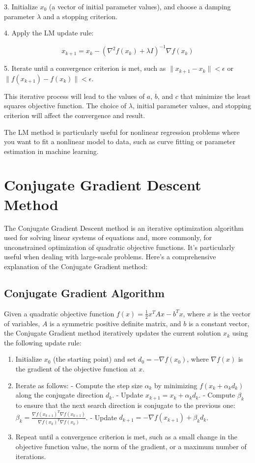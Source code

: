 \documentclass[a4paper]{article}
\begin{document}
3. Initialize $x_0$ (a vector of initial parameter values), and choose a damping parameter $\lambda$ and a stopping criterion.

4. Apply the LM update rule:

\[
x_{k+1} = x_k - \left(\nabla^2 f(x_k) + \lambda I\right)^{-1} \nabla f(x_k)
\]

5. Iterate until a convergence criterion is met, such as $\|x_{k+1} - x_k\| < \epsilon$ or $\|f(x_{k+1}) - f(x_k)\| < \epsilon$.

This iterative process will lead to the values of $a$, $b$, and $c$ that minimize the least squares objective function. The choice of $\lambda$, initial parameter values, and stopping criterion will affect the convergence and result.

The LM method is particularly useful for nonlinear regression problems where you want to fit a nonlinear model to data, such as curve fitting or parameter estimation in machine learning.

\section{Conjugate Gradient Descent Method}

The Conjugate Gradient Descent method is an iterative optimization algorithm used for solving linear systems of equations and, more commonly, for unconstrained optimization of quadratic objective functions. It's particularly useful when dealing with large-scale problems. Here's a comprehensive explanation of the Conjugate Gradient method:

\subsection{Conjugate Gradient Algorithm}

Given a quadratic objective function $f(x) = \frac{1}{2}x^TAx - b^Tx$, where $x$ is the vector of variables, $A$ is a symmetric positive definite matrix, and $b$ is a constant vector, the Conjugate Gradient method iteratively updates the current solution $x_k$ using the following update rule:

\begin{enumerate}
  \item Initialize $x_0$ (the starting point) and set $d_0 = -\nabla f(x_0)$, where $\nabla f(x)$ is the gradient of the objective function at $x$.

  \item Iterate as follows:
     - Compute the step size $\alpha_k$ by minimizing $f(x_k + \alpha_k d_k)$ along the conjugate direction $d_k$.
     - Update $x_{k+1} = x_k + \alpha_k d_k$.
     - Compute $\beta_k$ to ensure that the next search direction is conjugate to the previous one: $\beta_k = \frac{{\nabla f(x_{k+1})^T \nabla f(x_{k+1})}}{{\nabla f(x_k)^T \nabla f(x_k)}}$.
     - Update $d_{k+1} = -\nabla f(x_{k+1}) + \beta_k d_k$.

  \item Repeat until a convergence criterion is met, such as a small change in the objective function value, the norm of the gradient, or a maximum number of iterations.
\end{enumerate}
\end{document}
